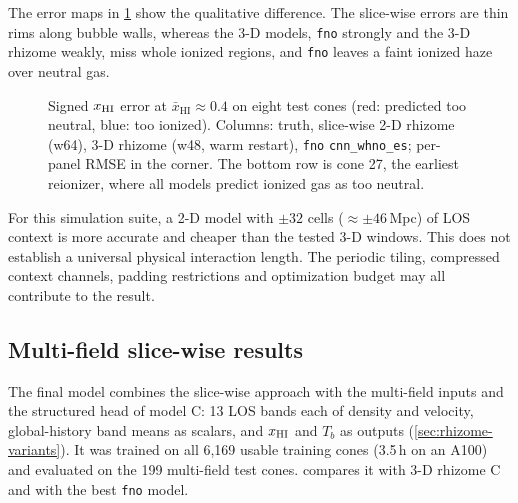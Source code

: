 The error maps in \cref{fig:slicewise-errors} show the qualitative difference. The slice-wise errors are thin rims along bubble walls, whereas the 3-D models, \texttt{fno} strongly and the 3-D rhizome weakly, miss whole ionized regions, and \texttt{fno} leaves a faint ionized haze over neutral gas.

\begin{figure}[!htbp]
  \centering
  \caption{Signed $x_{\mathrm{HI}}$ error at $\bar x_{\mathrm{HI}}\approx0.4$ on eight test cones (red: predicted too neutral, blue: too ionized). Columns: truth, slice-wise 2-D rhizome (w64), 3-D rhizome (w48, warm restart), \texttt{fno} \texttt{cnn\_whno\_es}; per-panel RMSE in the corner. The bottom row is cone 27, the earliest reionizer, where all models predict ionized gas as too neutral.}
  \label{fig:slicewise-errors}
\end{figure}

For this simulation suite, a 2-D model with $\pm32$ cells ($\approx\pm46$\,Mpc) of LOS context is more accurate and cheaper than the tested 3-D windows. This does not establish a universal physical interaction length. The periodic tiling, compressed context channels, padding restrictions and optimization budget may all contribute to the result.

\subsection{Multi-field slice-wise results}
\label{sec:main-results}

The final model combines the slice-wise approach with the multi-field inputs and the structured head of model C: 13 LOS bands each of density and velocity, global-history band means as scalars, and $x_{\mathrm{HI}}$ and $T_b$ as outputs (\cref{sec:rhizome-variants}). It was trained on all 6,169 usable training cones (3.5\,h on an A100) and evaluated on the 199 multi-field test cones.  compares it with 3-D rhizome C and with the best \texttt{fno} model.

